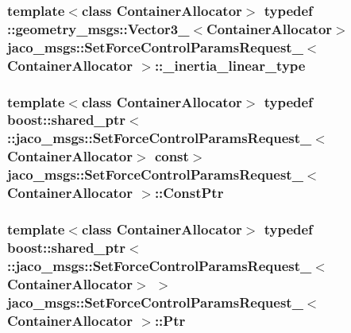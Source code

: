 \subsubsection[{\texorpdfstring{\+\_\+inertia\+\_\+linear\+\_\+type}{_inertia_linear_type}}]{\setlength{\rightskip}{0pt plus 5cm}template$<$class Container\+Allocator$>$ typedef \+::geometry\+\_\+msgs\+::\+Vector3\+\_\+$<$Container\+Allocator$>$ {\bf jaco\+\_\+msgs\+::\+Set\+Force\+Control\+Params\+Request\+\_\+}$<$ Container\+Allocator $>$\+::{\bf \+\_\+inertia\+\_\+linear\+\_\+type}}\hypertarget{structjaco__msgs_1_1SetForceControlParamsRequest___a72df435d24614736e733258c4a1b8919}{}\label{structjaco__msgs_1_1SetForceControlParamsRequest___a72df435d24614736e733258c4a1b8919}
\subsubsection[{\texorpdfstring{Const\+Ptr}{ConstPtr}}]{\setlength{\rightskip}{0pt plus 5cm}template$<$class Container\+Allocator$>$ typedef boost\+::shared\+\_\+ptr$<$ \+::{\bf jaco\+\_\+msgs\+::\+Set\+Force\+Control\+Params\+Request\+\_\+}$<$Container\+Allocator$>$ const$>$ {\bf jaco\+\_\+msgs\+::\+Set\+Force\+Control\+Params\+Request\+\_\+}$<$ Container\+Allocator $>$\+::{\bf Const\+Ptr}}\hypertarget{structjaco__msgs_1_1SetForceControlParamsRequest___ae148bd5dd3c40a09e1af84e3a2ed245a}{}\label{structjaco__msgs_1_1SetForceControlParamsRequest___ae148bd5dd3c40a09e1af84e3a2ed245a}
\subsubsection[{\texorpdfstring{Ptr}{Ptr}}]{\setlength{\rightskip}{0pt plus 5cm}template$<$class Container\+Allocator$>$ typedef boost\+::shared\+\_\+ptr$<$ \+::{\bf jaco\+\_\+msgs\+::\+Set\+Force\+Control\+Params\+Request\+\_\+}$<$Container\+Allocator$>$ $>$ {\bf jaco\+\_\+msgs\+::\+Set\+Force\+Control\+Params\+Request\+\_\+}$<$ Container\+Allocator $>$\+::{\bf Ptr}}\hypertarget{structjaco__msgs_1_1SetForceControlParamsRequest___a6f9103b3c32ab4166e19d1380abd2341}{}\label{structjaco__msgs_1_1SetForceControlParamsRequest___a6f9103b3c32ab4166e19d1380abd2341}
